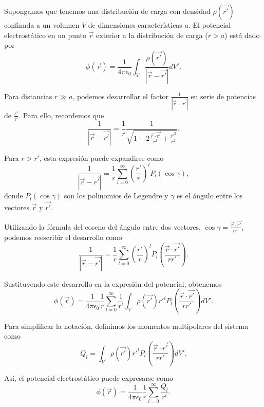 \documentclass[12pt,a4paper]{book}
\begin{document}
Supongamos que tenemos una distribución de carga con densidad $\rho(\vec{r'})$ confinada a un volumen $V$ de dimensiones características $a$. El potencial electrostático en un punto $\vec{r}$ exterior a la distribución de carga ($r > a$) está dado por
\begin{equation}
\phi(\vec{r}) = \frac{1}{4\pi\epsilon_0}\int_V \frac{\rho(\vec{r'})}{|\vec{r} - \vec{r'}|} dV'.
\end{equation}

Para distancias $r \gg a$, podemos desarrollar el factor $\frac{1}{|\vec{r} - \vec{r'}|}$ en serie de potencias de $\frac{r'}{r}$. Para ello, recordemos que
\begin{equation}
\frac{1}{|\vec{r} - \vec{r'}|} = \frac{1}{r}\frac{1}{\sqrt{1 - 2\frac{\vec{r}\cdot\vec{r'}}{r^2} + \frac{r'^2}{r^2}}}.
\end{equation}

Para $r > r'$, esta expresión puede expandirse como
\begin{equation}
\frac{1}{|\vec{r} - \vec{r'}|} = \frac{1}{r}\sum_{l=0}^{\infty}\left(\frac{r'}{r}\right)^l P_l(\cos\gamma),
\end{equation}
donde $P_l(\cos\gamma)$ son los polinomios de Legendre y $\gamma$ es el ángulo entre los vectores $\vec{r}$ y $\vec{r'}$.

Utilizando la fórmula del coseno del ángulo entre dos vectores, $\cos\gamma = \frac{\vec{r}\cdot\vec{r'}}{rr'}$, podemos reescribir el desarrollo como
\begin{equation}
\frac{1}{|\vec{r} - \vec{r'}|} = \frac{1}{r}\sum_{l=0}^{\infty}\left(\frac{r'}{r}\right)^l P_l\left(\frac{\vec{r}\cdot\vec{r'}}{rr'}\right).
\end{equation}

Sustituyendo este desarrollo en la expresión del potencial, obtenemos
\begin{equation}
\phi(\vec{r}) = \frac{1}{4\pi\epsilon_0}\frac{1}{r}\sum_{l=0}^{\infty}\frac{1}{r^l}\int_V \rho(\vec{r'})r'^l P_l\left(\frac{\vec{r}\cdot\vec{r'}}{rr'}\right) dV'.
\end{equation}

Para simplificar la notación, definimos los momentos multipolares del sistema como
\begin{equation}
Q_l = \int_V \rho(\vec{r'})r'^l P_l\left(\frac{\vec{r}\cdot\vec{r'}}{rr'}\right) dV'.
\end{equation}

Así, el potencial electrostático puede expresarse como
\begin{equation}
\phi(\vec{r}) = \frac{1}{4\pi\epsilon_0}\frac{1}{r}\sum_{l=0}^{\infty}\frac{Q_l}{r^l}.
\end{equation}
\end{document}
